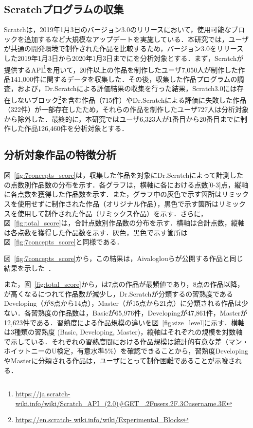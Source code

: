 \documentclass[submit]{ipsj}
\begin{document}
\subsection{Scratchプログラムの収集}
Scratchは，2019年1月3日のバージョン3.0のリリースにおいて，使用可能なブロックを追加するなど大規模なアップデートを実施している．本研究では，ユーザが共通の開発環境で制作された作品を比較するため，バージョン3.0をリリースした2019年1月3日から2020年1月3日までに\textcolor{red}{}を分析対象とする．まず，Scratchが提供するAPI\footnote{\url{https://ja.scratch-wiki.info/wiki/Scratch_API_(2.0)#GET_.2Fusers.2F.3Cusername.3E}}を用いて，20件以上の作品を制作したユーザ7,050人が制作した作品141,000件に関するデータを収集した．その後，収集した作品プログラムの調査，および，Dr.Scratchによる評価結果の収集を行った結果，Scratch3.0には存在しないブロック\footnote{\url{https://en.scratch- wiki.info/wiki/Experimental_Blocks}}を含む作品（715件）やDr.Scratchによる評価に失敗した作品（322件）が一部存在したため，それらの作品を制作したユーザ727人は分析対象から除外した．最終的に，本研究ではユーザ6,323人が1番目から20番目までに制作した作品126,460件を分析対象とする．

\subsection{分析対象作品の特徴分析}

図~\ref{fig:7concepts_score}は，収集した作品を対象にDr.Scratchによって計測した\textcolor{red}{}の点数別作品数の分布を示す．各グラフは，横軸に各\textcolor{red}{}における点数[0-3]点，縦軸に各点数を獲得した作品数を示す．また，グラフ中の灰色で示す箇所はリミックスを使用せずに制作された作品（オリジナル作品），黒色で示す箇所はリミックスを使用して制作された作品（リミックス作品）を示す．さらに，図~\ref{fig:total_score}は，合計点数別作品数の分布を示す．横軸は合計点数，縦軸は各点数を獲得した作品数を示す．灰色，黒色で示す箇所は図~\ref{fig:7concepts_score}と同様である．

図~\ref{fig:7concepts_score}から，\textcolor{red}{}この結果は，Aivaloglouらが公開する作品と同じ結果を示した~\cite{Aivaloglou_2017}．

また，図~\ref{fig:total_score}から，\textcolor{red}{}は7点の作品が最頻値であり，8点の作品以降，\textcolor{red}{}が高くなるにつれて作品数が減少し，Dr.Scratchが分類する\textcolor{red}{}の習熟度であるDeveloping（\textcolor{red}{}が8点から14点），Master（\textcolor{red}{}が15点から21点）に分類される作品は少ない．各習熟度の作品数は，Basicが65,976件，Developingが47,861件，Masterが12,623件である．習熟度による作品規模の違いを図~\ref{fig:size_level}に示す．横軸は3種類の習熟度 (Basic, Developing, Master)，縦軸はそれぞれの規模を対数軸で示している．それぞれの習熟度間における作品規模は統計的有意な差（マン・ホイットニーのU検定，有意水準5\%）を確認できることから，習熟度DevelopingやMasterに分類される作品は，ユーザにとって制作困難であることが示唆される．
\end{document}

